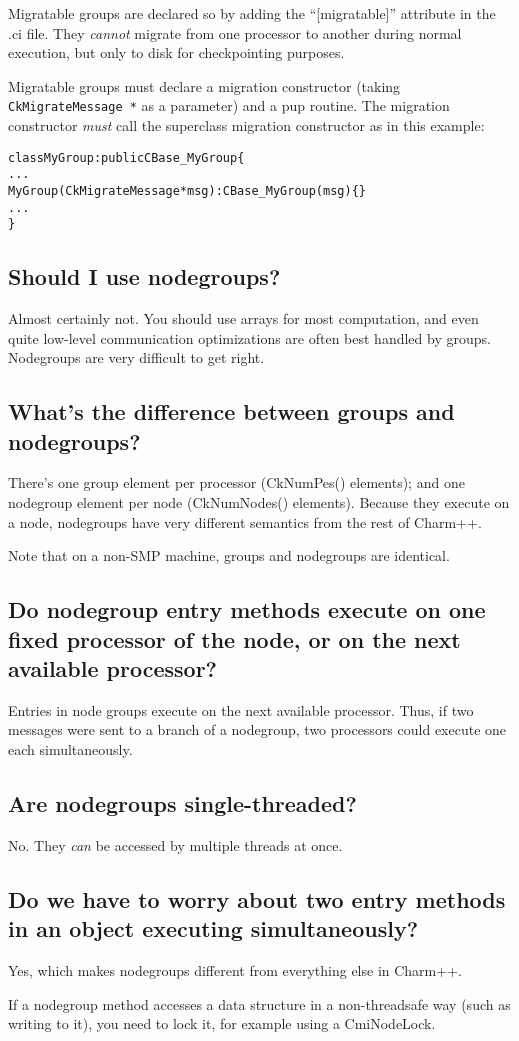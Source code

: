 Migratable groups are declared so by adding the ``[migratable]'' attribute in
the .ci file. They {\em cannot} migrate from one processor to another during
normal execution, but only to disk for checkpointing purposes.

Migratable groups must declare a migration constructor (taking
{\tt CkMigrateMessage *} as a parameter) and a pup routine. The migration
constructor {\em must} call the superclass migration constructor as in this
example:
\begin{alltt}
class MyGroup : public CBase\_MyGroup \{
  ...
  MyGroup (CkMigrateMessage *msg) : CBase\_MyGroup(msg) \{ \}
  ...
\}
\end{alltt}

\subsection{Should I use nodegroups?}

Almost certainly not. You should use arrays for most computation, and
even quite low-level communication optimizations are often best handled
by groups. Nodegroups are very difficult to get right.

\subsection{What's the difference between groups and nodegroups?}

There's one group element per processor (CkNumPes() elements); and
one nodegroup element per node (CkNumNodes() elements). Because they
execute on a node, nodegroups have very different semantics from the rest
of Charm++.

Note that on a non-SMP machine, groups and nodegroups are identical.


\subsection{Do nodegroup entry methods execute on one fixed processor of the node,
or on the next available processor?}

Entries in node groups execute on the next available processor. Thus,
if two messages were sent to a branch of a nodegroup, two processors could
execute one each simultaneously.

\subsection{Are nodegroups single-threaded?}

No. They {\em can} be accessed by multiple threads at once.

\subsection{Do we have to worry about two entry methods in an object executing simultaneously?}

Yes, which makes nodegroups different from everything else in Charm++.

If a nodegroup method accesses a data structure in a non-threadsafe
way (such as writing to it), you need to lock it, for example using a CmiNodeLock.
